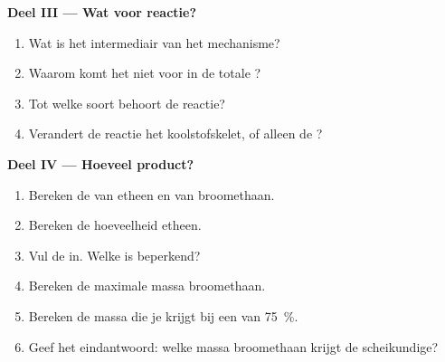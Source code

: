\begin{problem}
\medskip
\noindent\textbf{Deel III --- Wat voor reactie?}
\begin{enumerate}[resume]
  \item Wat is het intermediair van het mechanisme?
  \item Waarom komt het niet voor in de totale ?
  \item Tot welke soort behoort de reactie?
  \item Verandert de reactie het koolstofskelet, of alleen de
        ?
\end{enumerate}

\medskip
\noindent\textbf{Deel IV --- Hoeveel product?}
\begin{enumerate}[resume]
  \item Bereken de  van etheen en van broomethaan.
  \item Bereken de hoeveelheid etheen.
  \item Vul de  in. Welke  is beperkend?
  \item Bereken de maximale massa broomethaan.
  \item Bereken de massa die je krijgt bij een  van
        \qty{75}{\percent}.
  \item Geef het eindantwoord: welke massa broomethaan krijgt de
        scheikundige?
\end{enumerate}
\end{problem}
